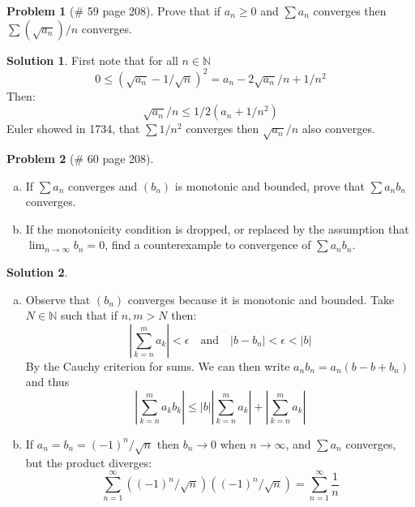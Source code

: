 \documentclass{article}
\theoremstyle{definition}
\newtheorem*{soln}{Solution}
\newtheorem*{prob}{Problem}
\theoremstyle{theorem}
\newcommand{\N}{\mathbb{N}}
\begin{document}
\begin{prob}[\# 59  page 208]
    Prove that if $a_n\geq 0$ and $\sum a_n$ converges then $\sum(\sqrt{a_n})/n$ converges.
\end{prob}
\begin{soln}
   First note that for all $n\in \N$
    $$0\leq (\sqrt{a_n}-1/\sqrt n)^2 = a_n - 2\sqrt{a_n}/n + 1/n^2$$
    Then:
    $$\sqrt{a_n}/n\leq 1/2(a_n +1/n^2)$$
    Euler showed in 1734, that $\sum 1/n^2$ converges then $\sqrt{a_n}/n$ also converges.
\end{soln}
\vspace{1in}

\begin{prob}[\# 60  page 208]
    \begin{enumerate}[(a)]
        \item If $\sum a_n$ converges and $(b_n)$ is monotonic and bounded, prove that $\sum a_nb_n$ converges.
        \item If the monotonicity condition is dropped, or replaced by the assumption that $\lim_{n\to \infty }b_n =0$, find a counterexample to convergence of $\sum a_n b_n$.
    \end{enumerate}
\end{prob}
\begin{soln}
    \begin{enumerate}[(a)]
        \item Observe that $(b_n)$ converges because it is monotonic and bounded. Take $N\in \N$ such that if $n,m>N$ then:
            $$\left|\sum_{k=n }^m a_k \right| <\epsilon \quad \text{and} \quad |b-b_n|<\epsilon<|b|$$
            By the Cauchy criterion for sums. We can then write $a_nb_n = a_n(b-b+b_n)$ and thus
            $$\left|\sum_{k=n }^m a_kb_k \right| \leq |b|\left|\sum_{k=n }^m a_k \right| + \left|\sum_{k=n }^m a_k \right|$$
        \item If $a_n = b_n = (-1)^n/\sqrt{n}$ then $b_n \to 0$ when $n\to \infty$, and $\sum a_n$ converges, but the product diverges:
            $$\sum_{n=1}^\infty \left((-1)^n/\sqrt{n}\right)\left((-1)^n/\sqrt{n}\right) = \sum_{n=1}^\infty \frac 1{n}$$
    \end{enumerate}

\end{soln}
\vspace{1in}
\end{document}
